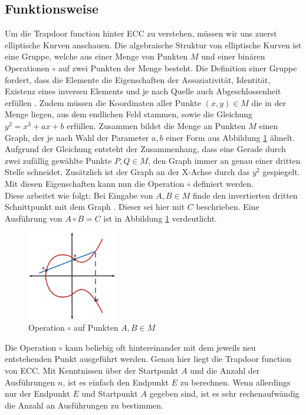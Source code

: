 \documentclass[
	fontsize=11pt,
	headings=small,
	parskip=half,           %
	bibliography=totoc,
	numbers=noenddot,       %
	open=any,               %
]{scrreprt}
\begin{document}
\subsection{Funktionsweise}
Um die Trapdoor function hinter ECC zu verstehen, müssen wir uns zuerst elliptische Kurven anschauen. Die algebraische Struktur von elliptische Kurven ist eine Gruppe, welche aus einer Menge von Punkten $M$ und einer binären Operationen $\circ$ auf zwei Punkten der Menge besteht. Die Definition einer Gruppe fordert, dass die Elemente die Eigenschaften der Assoziativität, Identität, Existenz eines inversen Elements und je nach Quelle auch Abgeschlossenheit erfüllen \cite{ecc-aradi2016einfuhrung, ecc-bogopolskij2008introduction}. Zudem müssen die Koordinaten aller Punkte $(x,y) \in M$ die in der Menge liegen, aus dem endlichen Feld stammen, sowie die Gleichung    $y^2 = x^3+ax+b$ erfüllen. Zusammen bildet die Menge an Punkten $M$ einen Graph, der je nach Wahl der Parameter $a,b$ einer Form aus Abbildung \ref{fig:ecc_2} ähnelt. Aufgrund der Gleichung entsteht der Zusammenhang, dass eine Gerade durch zwei zufällig gewählte Punkte $P,Q \in M$, den Graph immer an genau einer dritten Stelle schneidet. Zusätzlich ist der Graph an der X-Achse durch das $y^2$ gespiegelt. Mit diesen Eigenschaften kann nun die Operation $\circ$ definiert werden.\\
Diese arbeitet wie folgt: Bei Eingabe von $A,B \in M$ finde den invertierten dritten Schnittpunkt mit dem Graph \cite{ecc-Goyal2021Empirical}. Dieser sei hier mit $C$ beschrieben. Eine Ausführung von $A \circ B = C$ ist in Abbildung \ref{fig:ecc_2} verdeutlicht.

\begin{figure}[h]
    \centering
    \includegraphics[width=0.35\textwidth]{ecc_2.png}
    \caption{Operation $\circ$ auf Punkten $A,B \in M$ \cite{ecc-cloud2013elliptic}}
    \label{fig:ecc_2}
\end{figure}

Die Operation $\circ$ kann beliebig oft hintereinander mit dem jeweils neu entstehenden Punkt ausgeführt werden. Genau hier liegt die Trapdoor function von ECC. Mit Kenntnissen über der Startpunkt $A$ und die Anzahl der Ausführungen $n$, ist es einfach den Endpunkt $E$ zu berechnen. Wenn allerdings nur der Endpunkt $E$ und Startpunkt $A$ gegeben sind, ist es sehr rechenaufwändig die Anzahl an Ausführungen zu bestimmen.
\end{document}
